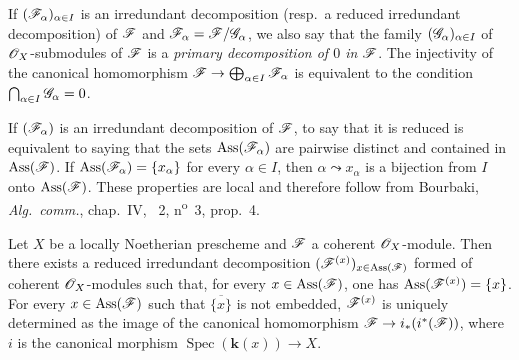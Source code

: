 If $(\mathscr{F}_\alpha)_{\alpha\in I}$ is an irredundant decomposition (resp.\ a reduced irredundant decomposition) of $\mathscr{F}$ and $\mathscr{F}_\alpha=\mathscr{F}/\mathscr{G}_\alpha$, we also say that the family $(\mathscr{G}_\alpha)_{\alpha\in I}$ of $\mathscr{O}_X$-submodules of $\mathscr{F}$ is a \emph{primary decomposition of $0$ in $\mathscr{F}$}.  The injectivity of the canonical homomorphism $\mathscr{F}\to\bigoplus_{\alpha\in I}\mathscr{F}_\alpha$ is equivalent to the condition $\bigcap_{\alpha\in I}\mathscr{G}_\alpha=0$.

If $(\mathscr{F}_\alpha)$ is an irredundant decomposition of $\mathscr{F}$, to say that it is reduced is equivalent to saying that the sets $\operatorname{Ass}(\mathscr{F}_\alpha)$ are pairwise distinct and contained in $\operatorname{Ass}(\mathscr{F})$.  If $\operatorname{Ass}(\mathscr{F}_\alpha)=\{x_\alpha\}$ for every $\alpha\in I$, then $\alpha\leadsto x_\alpha$ is a bijection from $I$ onto $\operatorname{Ass}(\mathscr{F})$.  These properties are local and therefore follow from Bourbaki, \emph{Alg.\ comm.}, chap.~IV, \textsection~2, n\textsuperscript{o}~3, prop.~4.

\begin{proposition}[3.2.6]
\label{IV.3.2.6}
Let $X$ be a locally Noetherian prescheme and $\mathscr{F}$ a coherent $\mathscr{O}_X$-module.
Then there exists a reduced irredundant decomposition $(\mathscr{F}^{(x)})_{x\in\operatorname{Ass}(\mathscr{F})}$ formed of coherent $\mathscr{O}_X$-modules such that, for every $x\in\operatorname{Ass}(\mathscr{F})$, one has $\operatorname{Ass}(\mathscr{F}^{(x)})=\{x\}$.
For every $x\in\operatorname{Ass}(\mathscr{F})$ such that $\overline{\{x\}}$ is not embedded, $\mathscr{F}^{(x)}$ is uniquely determined as the image of the canonical homomorphism $\mathscr{F}\to i_*(i^*(\mathscr{F}))$, where $i$ is the canonical morphism $\operatorname{Spec}(\boldsymbol{k}(x))\to X$.
\end{proposition}

